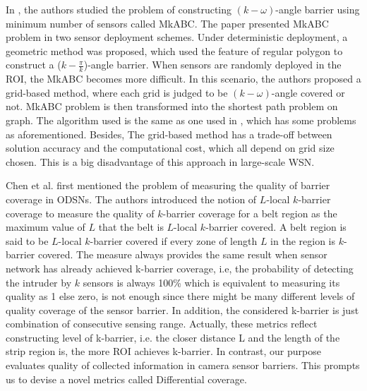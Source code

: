In \cite{xu2016minimum}, the authors studied the problem of constructing $(k-\omega)$-angle barrier using minimum number of sensors called MkABC. The paper presented MkABC problem in two sensor deployment schemes. Under deterministic deployment, a geometric method was proposed, which used the feature of regular polygon to construct a ($k-\displaystyle\frac{\pi}{k}$)-angle barrier. When sensors are randomly deployed in the ROI, the MkABC becomes more difficult. In this scenario, the authors proposed a grid-based method, where each grid is judged to be $(k-\omega)$-angle covered or not. MkABC problem is then transformed into the shortest path problem on graph. The algorithm used is the same as one used in \cite{ma2012minimum}, which has some problems as aforementioned. Besides, The grid-based method has a trade-off between solution accuracy and the computational cost, which all depend on grid size chosen. This is a big disadvantage of this approach in large-scale WSN. 

Chen et al. \cite{chen2008measuring} first mentioned the problem of measuring the quality of barrier coverage in ODSNs. The authors introduced the notion of $L$-local $k$-barrier coverage to measure the quality of $k$-barrier coverage for a belt region as the maximum value of $L$ that the belt is $L$-local $k$-barrier covered. A belt region is said to be $L$-local $k$-barrier covered if every zone of length $L$ in the region is $k$-barrier covered. The measure always provides the same result when sensor network has already achieved k-barrier coverage, i.e, the probability of detecting the intruder by $k$ sensors is always 100\% which is equivalent to measuring its quality as 1 else zero, is not enough since there might be many different levels of quality coverage of the sensor barrier.  In addition, the considered k-barrier is just combination of consecutive sensing range. Actually, these metrics reflect constructing level of k-barrier, i.e. the closer distance L and the length of the strip region is, the more ROI achieves k-barrier. In contrast, our purpose evaluates quality of collected information in camera sensor barriers. This prompts us to devise a novel metrics called Differential coverage.  

